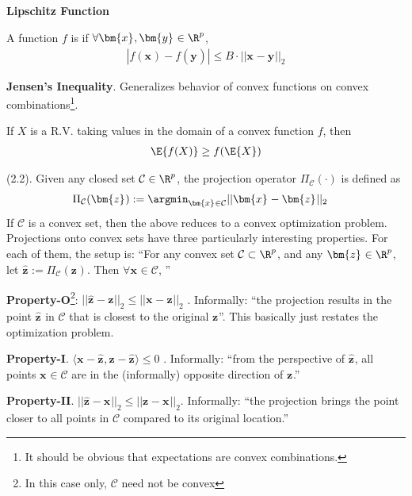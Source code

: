 \documentclass[11pt]{article}
\renewcommand\vec[2][]{\bm{#2}_{#1}}
\newcommand\myspace[1][]{\vspace{#1\bigskipamount}}
\newcommand\p{\Needspace{10\baselineskip} \noindent}
\begin{document}
\textbf{Lipschitz Function}
\begin{definition}[-1em]
	A function $f$ is  if $\forall \vec x, \vec y \in \R^p$,
	\begin{align}
		|f(\vec x) - f(\vec y)| \le B \cdot ||\vec x - \vec y ||_2
	\end{align}
\end{definition}

\textbf{Jensen's Inequality}. Generalizes behavior of convex functions on convex combinations\footnote{It should be obvious that expectations are convex combinations.}.
\begin{definition}[-1em]
	If $X$ is a R.V. taking values in the domain of a convex function $f$, then
	\begin{align}
		\E{f(X)} \ge f(\E{X})
	\end{align}
\end{definition}


\myspace{}
\p {} (2.2). Given any closed set $\mathcal C \in \R^p$, the projection operator $\Pi_{\mathcal C}(\cdot)$ is defined as
\begin{align}
	\Pi_{\mathcal C}(\vec z)
		&:= \argmin_{\vec x \in \mathcal C} || \vec x - \vec z ||_2
\end{align}
If $\mathcal C$ is a convex set, then the above reduces to a convex optimization problem. Projections onto convex sets have three particularly interesting properties. For each of them, the setup is: ``For any convex set $\mathcal C \subset \R^p$, and any $\vec z \in \R^p$, let $\hat{\vec z} := \Pi_{\mathcal C}(\vec z)$. Then $\forall \vec x \in \mathcal C$, \textellipsis''
\begin{compactitem}
	\item \textbf{Property-O}\footnote{In this case only, $\mathcal C$ need not be convex}: 
	$
		||\hat{\vec z} - \vec z||_2 \le ||\vec x - \vec z||_2
	$
	. Informally: ``the projection results in the point $\hat{\vec z}$ in $\mathcal C$ that is closest to the original $\vec z$''. This basically just restates the optimization problem. 
	
	\item \textbf{Property-I}. 
	$
		\langle \vec x - \hat{\vec z}, \vec z - \hat{\vec z} \rangle \le 0
	$
	. Informally: ``from the perspective of $\hat{\vec z}$, all points $\vec x \in \mathcal C$ are in the (informally) opposite direction of $\vec z$.''
	
	\item \textbf{Property-II}. $|| \hat{\vec z} - \vec x||_2 \le ||\vec z - \vec x||_2$. Informally: ``the projection brings the point closer to all points in $\mathcal C$ compared to its original location.''
\end{compactitem}
\end{document}
